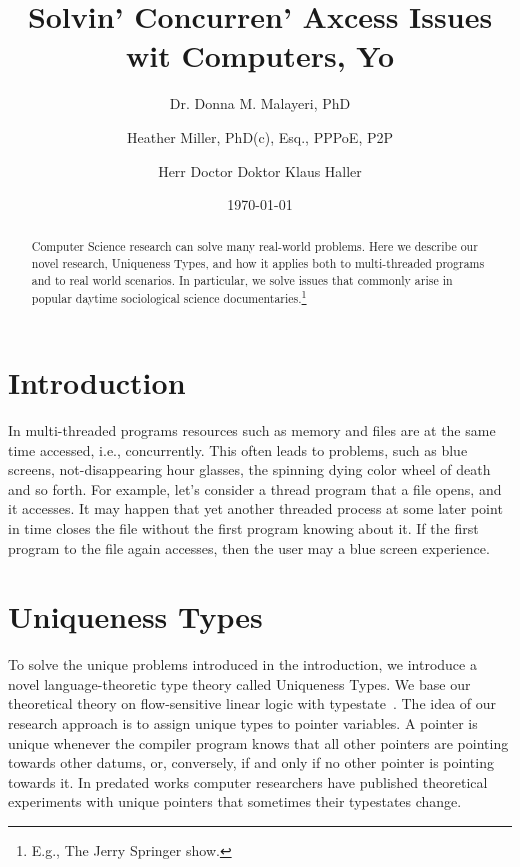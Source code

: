 \documentclass[10pt,twocolumn,letterpaper]{article}
\begin{document}
\title{Solvin' Concurren' Axcess Issues wit Computers, Yo}

\author{Dr. Donna M. Malayeri, PhD \and Heather Miller, PhD(c), Esq., PPPoE, P2P \and Herr Doctor Doktor Klaus Haller}
\date{\today}

\maketitle

\pagestyle{empty}
\thispagestyle{empty}

\begin{abstract}
Computer Science research can solve many real-world problems. Here we describe our novel research, Uniqueness Types, and how it applies both to multi-threaded programs and to real world scenarios. In particular, we solve issues that commonly arise in popular daytime sociological science documentaries.\footnote{E.g., The Jerry Springer show.}
\end{abstract}

\section{Introduction}
In multi-threaded programs resources such as memory and files are at the same time accessed, i.e., concurrently. This often leads to problems, such as blue screens, not-disappearing hour glasses, the spinning dying color wheel of death and so forth. For example, let's consider a thread program that a file opens, and it accesses. It may happen that yet another threaded process at some later point in time closes the file without the first program knowing about it. If the first program to the file again accesses, then the user may a blue screen experience.

\section{Uniqueness Types}
To solve the unique problems introduced in the introduction, we introduce a novel language-theoretic type theory called Uniqueness Types. We base our theoretical theory on flow-sensitive linear logic with typestate~\cite{CMUwork}. The idea of our research approach is to assign unique types to pointer variables. A pointer is unique whenever the compiler program knows that all other pointers are pointing towards other datums, or, conversely, if and only if no other pointer is pointing towards it. In predated works computer researchers have published theoretical experiments with unique pointers that sometimes their typestates change.
\end{document}
